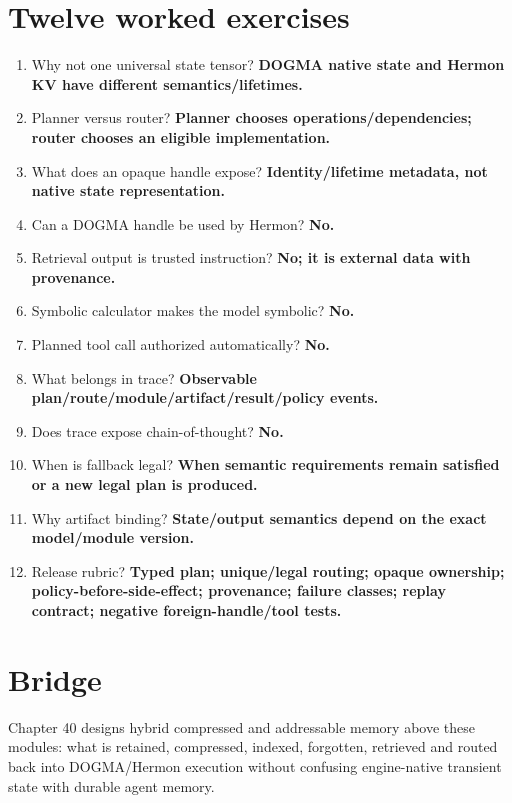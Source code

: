 \section{Twelve worked exercises}
\begin{enumerate}
\item Why not one universal state tensor? \textbf{DOGMA native state and Hermon KV have different semantics/lifetimes.}
\item Planner versus router? \textbf{Planner chooses operations/dependencies; router chooses an eligible implementation.}
\item What does an opaque handle expose? \textbf{Identity/lifetime metadata, not native state representation.}
\item Can a DOGMA handle be used by Hermon? \textbf{No.}
\item Retrieval output is trusted instruction? \textbf{No; it is external data with provenance.}
\item Symbolic calculator makes the model symbolic? \textbf{No.}
\item Planned tool call authorized automatically? \textbf{No.}
\item What belongs in trace? \textbf{Observable plan/route/module/artifact/result/policy events.}
\item Does trace expose chain-of-thought? \textbf{No.}
\item When is fallback legal? \textbf{When semantic requirements remain satisfied or a new legal plan is produced.}
\item Why artifact binding? \textbf{State/output semantics depend on the exact model/module version.}
\item Release rubric? \textbf{Typed plan; unique/legal routing; opaque ownership; policy-before-side-effect; provenance; failure classes; replay contract; negative foreign-handle/tool tests.}
\end{enumerate}

\section{Bridge}
Chapter 40 designs hybrid compressed and addressable memory above these modules: what is retained, compressed, indexed, forgotten, retrieved and routed back into DOGMA/Hermon execution without confusing engine-native transient state with durable agent memory.
